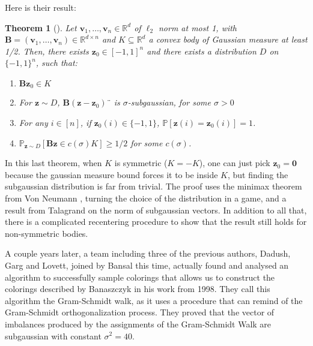 \documentclass[12pt]{article}
\newtheorem{theorem}{Theorem}
\begin{document}
Here is their result:
\begin{theorem}[\cite{construct}]\label{equivalence}
        Let $\textbf{v}_1, \dots, \textbf{v}_n \in \mathbb{R}^d$ of $\ell_2$ norm at most 1, with $\textbf{B}= (\textbf{v}_1, \dots, \textbf{v}_n) \in \mathbb{R}^{d \times n}$ and $K \subseteq \mathbb{R}^d$ a convex body  of Gaussian measure at least 1/2.
        Then, there exists $\textbf{z}_0 \in [-1,1]^n$ and there exists a distribution $D$ on $\{-1,1\}^n$, such that: 
        \begin{enumerate}
            \item  $\textbf{B}\textbf{z}_0 %
            \in K$\\
            \item  For $\textbf{z} \sim D$, $\textbf{B}(\textbf{z}-\textbf{z}_0)%
¨	 $ is $\sigma$-subgaussian, for some $\sigma >0$
            \item For any $i\in[n]$, if $\textbf{z}_0(i) \in \{-1, 1\}$, $\mathbb{P}[\textbf{z}(i)=\textbf{z}_0(i)]=1$.
            \item $\mathbb{P}_{\textbf{z} \sim D}[%
            \textbf{Bz}\in c(\sigma)K] \geq 1/2$ for some $c(\sigma)$.
        \end{enumerate}
    \end{theorem}
In this last theorem, when $K$ is symmetric ($K=-K$), one can just pick $\textbf{z}_0=\textbf{0}$ because the gaussian measure bound forces it to be inside $K$, but finding the subgaussian distribution is far from trivial. The proof uses the minimax theorem from Von Neumann \cite{neumann1928theorie}, turning the choice of the distribution in a game, and a result from Talagrand \cite{talagrand2005generic} on the norm of subgaussian vectors. In addition to all that, there is a complicated recentering procedure to show that the result still holds for non-symmetric bodies.

A couple years later, a team including three of the previous authors, Dadush, Garg and Lovett, joined by Bansal this time, actually found and analysed an algorithm to successfully sample colorings that allows us to construct the colorings described by Banaszczyk in his work from 1998. They call this algorithm the Gram-Schmidt walk, as it uses a procedure that can remind of the Gram-Schmidt orthogonalization process. They proved that the vector of imbalances produced by the assignments of the Gram-Schmidt Walk are subgaussian with constant $\sigma^2=40$.
\end{document}
